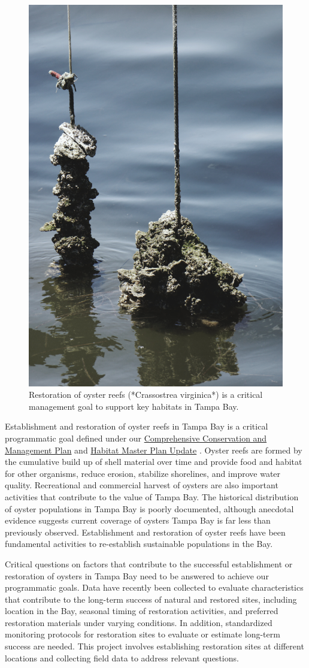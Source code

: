 \documentclass[
]{book}
\begin{document}
\begin{figure}

{\centering \includegraphics[width=0.5\linewidth]{img/oysters} 

}

\caption{Restoration of oyster reefs (*Crassostrea virginica*) is a critical management goal to support key habitats in Tampa Bay.}\label{fig:unnamed-chunk-11}
\end{figure}

Establishment and restoration of oyster reefs in Tampa Bay is a critical programmatic goal defined under our \href{https://indd.adobe.com/view/cf7b3c48-d2b2-4713-921c-c2a0d4466632}{Comprehensive Conservation and Management Plan} \citep{tbep1017} and \href{https://drive.google.com/file/d/1Hp0l_qtbxp1JxKJoGatdyuANSzQrpL0I/view}{Habitat Master Plan Update} \citep{tbep0720}. Oyster reefs are formed by the cumulative build up of shell material over time and provide food and habitat for other organisms, reduce erosion, stabilize shorelines, and improve water quality. Recreational and commercial harvest of oysters are also important activities that contribute to the value of Tampa Bay. The historical distribution of oyster populations in Tampa Bay is poorly documented, although anecdotal evidence suggests current coverage of oysters Tampa Bay is far less than previously observed. Establishment and restoration of oyster reefs have been fundamental activities to re-establish sustainable populations in the Bay.

Critical questions on factors that contribute to the successful establishment or restoration of oysters in Tampa Bay need to be answered to achieve our programmatic goals. Data have recently been collected to evaluate characteristics that contribute to the long-term success of natural and restored sites, including location in the Bay, seasonal timing of restoration activities, and preferred restoration materials under varying conditions. In addition, standardized monitoring protocols for restoration sites to evaluate or estimate long-term success are needed. This project involves establishing restoration sites at different locations and collecting field data to address relevant questions.
\end{document}
